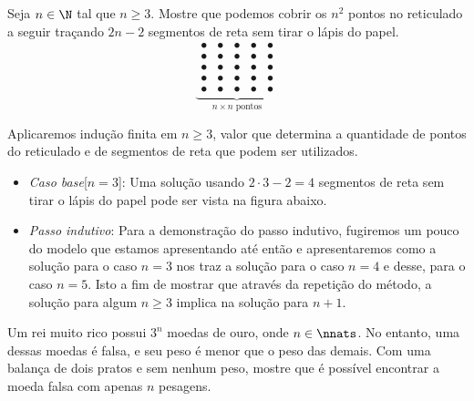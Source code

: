 \begin{example}
Seja $n \in \N$ tal que $n\ge 3$. Mostre  que podemos cobrir os $n^2$ pontos no reticulado a seguir traçando $2n-2$ segmentos de reta sem tirar o lápis do papel.
%
\begin{equation*}
\underbrace{\begin{array}{ccccc}
                \bullet & \bullet & \bullet & \bullet & \bullet \\
                \bullet & \bullet & \bullet & \bullet & \bullet \\
                \bullet & \bullet & \bullet & \bullet & \bullet \\
                \bullet & \bullet & \bullet & \bullet & \bullet \\
                \bullet & \bullet & \bullet & \bullet & \bullet
              \end{array}
}_{n \times n \text{ pontos}}
\end{equation*}
\begin{solution}
	Aplicaremos indução finita em $n \ge 3$, valor que determina a quantidade de pontos do reticulado e de segmentos de reta que podem ser utilizados.
	\begin{itemize}
		\item \textit{Caso base}[$n = 3$]: Uma solução usando $2\cdot 3 -2 = 4$ segmentos de reta sem tirar o lápis do papel pode ser vista na figura abaixo.
		\item \textit{Passo indutivo}: Para a demonstração do passo indutivo, fugiremos um pouco do modelo que estamos apresentando até então e apresentaremos como a solução para o caso $n = 3$ nos traz a solução para o caso $n = 4$ e desse, para o caso $n=5$. Isto a fim de mostrar que através da repetição do método, a solução para algum $n \ge 3$ implica na solução para $n+1$.
	\end{itemize}
\end{solution}
\end{example}

\begin{example}
Um rei muito rico possui $3^n$ moedas de ouro, onde $n \in \nnats$. No entanto, uma dessas moedas é falsa, e seu peso é menor que o peso das demais. Com uma balança de dois pratos e sem nenhum peso, mostre que é possível encontrar a moeda falsa com apenas $n$ pesagens.
\end{example}

